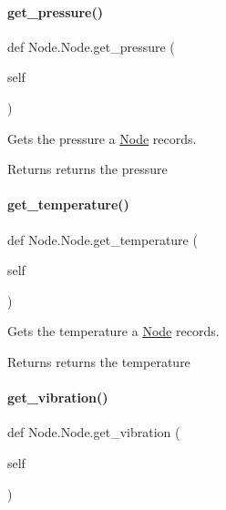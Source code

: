 \paragraph{\texorpdfstring{get\_pressure()}{get\_pressure()}}
{\footnotesize\ttfamily def Node.\+Node.\+get\+\_\+pressure (\begin{DoxyParamCaption}\item[{}]{self }\end{DoxyParamCaption})}



Gets the pressure a \mbox{\hyperlink{class_node_1_1_node}{Node}} records. 

\begin{DoxyReturn}{Returns}
returns the pressure 
\end{DoxyReturn}
\mbox{\label{class_node_1_1_node_a81b81432378f3793c80bad9745e67da6}} 
\paragraph{\texorpdfstring{get\_temperature()}{get\_temperature()}}
{\footnotesize\ttfamily def Node.\+Node.\+get\+\_\+temperature (\begin{DoxyParamCaption}\item[{}]{self }\end{DoxyParamCaption})}



Gets the temperature a \mbox{\hyperlink{class_node_1_1_node}{Node}} records. 

\begin{DoxyReturn}{Returns}
returns the temperature 
\end{DoxyReturn}
\mbox{\label{class_node_1_1_node_a1f9f5f5016e27b9233f29dd35fd91f95}} 
\paragraph{\texorpdfstring{get\_vibration()}{get\_vibration()}}
{\footnotesize\ttfamily def Node.\+Node.\+get\+\_\+vibration (\begin{DoxyParamCaption}\item[{}]{self }\end{DoxyParamCaption})}



